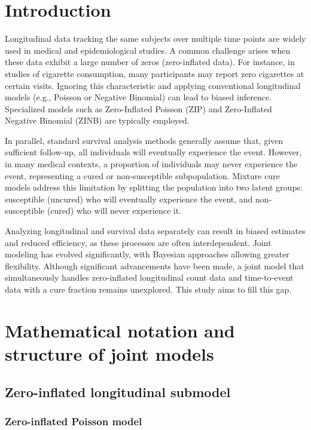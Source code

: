\documentclass[twoside]{article}
\begin{document}
\section{Introduction}

Longitudinal data tracking the same subjects over multiple time points are widely used in medical and epidemiological studies. A common challenge arises when these data exhibit a large number of zeros (zero-inflated data). For instance, in studies of cigarette consumption, many participants may report zero cigarettes at certain visits. Ignoring this characteristic and applying conventional longitudinal models (e.g., Poisson or Negative Binomial) can lead to biased inference. Specialized models such as Zero-Inflated Poisson (ZIP) and Zero-Inflated Negative Binomial (ZINB) are typically employed.

In parallel, standard survival analysis methods generally assume that, given sufficient follow-up, all individuals will eventually experience the event. However, in many medical contexts, a proportion of individuals may never experience the event, representing a cured or non-susceptible subpopulation. Mixture cure models address this limitation by splitting the population into two latent groups: susceptible (uncured) who will eventually experience the event, and non-susceptible (cured) who will never experience it.

Analyzing longitudinal and survival data separately can result in biased estimates and reduced efficiency, as these processes are often interdependent. Joint modeling has evolved significantly, with Bayesian approaches allowing greater flexibility. Although significant advancements have been made, a joint model that simultaneously handles zero-inflated longitudinal count data and time-to-event data with a cure fraction remains unexplored. This study aims to fill this gap.

\section{Mathematical notation and structure of joint models}

\subsection{Zero-inflated longitudinal submodel}

\subsubsection{Zero-inflated Poisson model}
\end{document}
